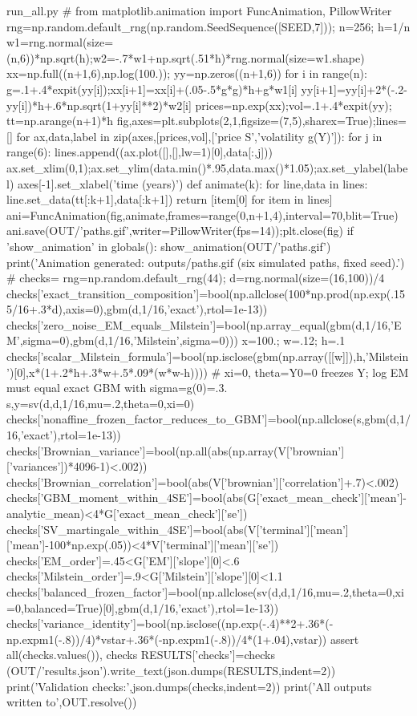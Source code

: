 \begin{filecontents*}[overwrite]{run_all.py}
# %
from matplotlib.animation import FuncAnimation, PillowWriter
rng=np.random.default_rng(np.random.SeedSequence([SEED,7])); n=256; h=1/n
w1=rng.normal(size=(n,6))*np.sqrt(h);w2=-.7*w1+np.sqrt(.51*h)*rng.normal(size=w1.shape)
xx=np.full((n+1,6),np.log(100.)); yy=np.zeros((n+1,6))
for i in range(n):
 g=.1+.4*expit(yy[i]);xx[i+1]=xx[i]+(.05-.5*g*g)*h+g*w1[i]
 yy[i+1]=yy[i]+2*(-.2-yy[i])*h+.6*np.sqrt(1+yy[i]**2)*w2[i]
prices=np.exp(xx);vol=.1+.4*expit(yy); tt=np.arange(n+1)*h
fig,axes=plt.subplots(2,1,figsize=(7,5),sharex=True);lines=[]
for ax,data,label in zip(axes,[prices,vol],['price S','volatility g(Y)']):
 for j in range(6): lines.append((ax.plot([],[],lw=1)[0],data[:,j]))
 ax.set_xlim(0,1);ax.set_ylim(data.min()*.95,data.max()*1.05);ax.set_ylabel(label)
axes[-1].set_xlabel('time (years)')
def animate(k):
 for line,data in lines: line.set_data(tt[:k+1],data[:k+1])
 return [item[0] for item in lines]
ani=FuncAnimation(fig,animate,frames=range(0,n+1,4),interval=70,blit=True)
ani.save(OUT/'paths.gif',writer=PillowWriter(fps=14));plt.close(fig)
if 'show_animation' in globals(): show_animation(OUT/'paths.gif')
print('Animation generated: outputs/paths.gif (six simulated paths, fixed seed).')
# %
checks={}
rng=np.random.default_rng(44); d=rng.normal(size=(16,100))/4
checks['exact_transition_composition']=bool(np.allclose(100*np.prod(np.exp(.155/16+.3*d),axis=0),gbm(d,1/16,'exact'),rtol=1e-13))
checks['zero_noise_EM_equals_Milstein']=bool(np.array_equal(gbm(d,1/16,'EM',sigma=0),gbm(d,1/16,'Milstein',sigma=0)))
x=100.; w=.12; h=.1
checks['scalar_Milstein_formula']=bool(np.isclose(gbm(np.array([[w]]),h,'Milstein')[0],x*(1+.2*h+.3*w+.5*.09*(w*w-h))))
# xi=0, theta=Y0=0 freezes Y; log EM must equal exact GBM with sigma=g(0)=.3.
s,y=sv(d,d,1/16,mu=.2,theta=0,xi=0)
checks['nonaffine_frozen_factor_reduces_to_GBM']=bool(np.allclose(s,gbm(d,1/16,'exact'),rtol=1e-13))
checks['Brownian_variance']=bool(np.all(abs(np.array(V['brownian']['variances'])*4096-1)<.002))
checks['Brownian_correlation']=bool(abs(V['brownian']['correlation']+.7)<.002)
checks['GBM_moment_within_4SE']=bool(abs(G['exact_mean_check']['mean']-analytic_mean)<4*G['exact_mean_check']['se'])
checks['SV_martingale_within_4SE']=bool(abs(V['terminal']['mean']['mean']-100*np.exp(.05))<4*V['terminal']['mean']['se'])
checks['EM_order']=.45<G['EM']['slope'][0]<.6
checks['Milstein_order']=.9<G['Milstein']['slope'][0]<1.1
checks['balanced_frozen_factor']=bool(np.allclose(sv(d,d,1/16,mu=.2,theta=0,xi=0,balanced=True)[0],gbm(d,1/16,'exact'),rtol=1e-13))
checks['variance_identity']=bool(np.isclose((np.exp(-.4)**2+.36*(-np.expm1(-.8))/4)*vstar+.36*(-np.expm1(-.8))/4*(1+.04),vstar))
assert all(checks.values()), checks
RESULTS['checks']=checks
(OUT/'results.json').write_text(json.dumps(RESULTS,indent=2))
print('Validation checks:',json.dumps(checks,indent=2))
print('All outputs written to',OUT.resolve())


\end{filecontents*}
